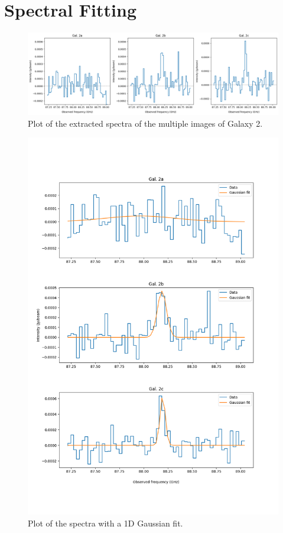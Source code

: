 \documentclass[11pt,letterpaper]{article}
\begin{document}
\section*{Spectral Fitting}

\begin{figure}[!htbp]
    \centering
    \includegraphics[width=\linewidth]{../figs/initial_spectra.png}
    \caption{Plot of the extracted spectra of the multiple images of Galaxy 2.}
    \label{fig:initial_spectra}
\end{figure}

\begin{figure}[!htbp]
    \centering
    \includegraphics[width=0.8\linewidth]{../figs/gaussian_fit.png}
    \caption{Plot of the spectra with a 1D Gaussian fit.}
    \label{fig:gaussian_fit}
\end{figure}
\end{document}

